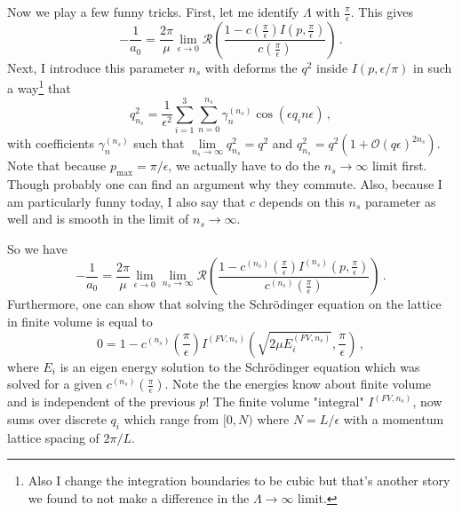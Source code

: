\documentclass[aps,superscriptaddress,tightenlines,nofootinbib,floatfix,longbibliography,notitlepage]{revtex4-1}
\begin{document}
Now we play a few funny tricks.
First, let me identify $\Lambda$ with $\frac{\pi}{\epsilon}$.
This gives
\begin{equation}
	- \frac{1}{a_0}
	=
	\frac{2 \pi}{\mu}
	\lim\limits_{\epsilon \to 0} \mathcal R \left(\frac{1 - c\left(\frac{\pi}{\epsilon}\right) I\left(p, \frac{\pi}{\epsilon}\right)}{c\left(\frac{\pi}{\epsilon}\right)} \right)
	\, .
\end{equation}
Next, I introduce this parameter $n_s$ with deforms the $q^2$ inside $I(p, \epsilon/\pi)$ in such a way\footnote{Also I change the integration boundaries to be cubic but that's another story we found to not make a difference in the $\Lambda \to \infty$ limit.} that
\begin{equation}
	q^2_{n_s} = \frac{1}{\epsilon^2}\sum_{i=1}^3\sum_{n=0}^{n_s}  \gamma_n^{(n_s)} \cos(\epsilon q_i n \epsilon) \, ,
\end{equation}
with coefficients $\gamma_n^{(n_s)}$ such that $\lim\limits_{n_s \to \infty} q^2_{n_s} = q^2$ and $q^2_{n_s} = q^2(1 + \mathcal O(q\epsilon)^{2 n_s})$.
Note that because $p_\text{max} = \pi / \epsilon$, we actually have to do the $n_s \to \infty$ limit first.
Though probably one can find an argument why they commute.
Also, because I am particularly funny today, I also say that $c$ depends on this $n_s$ parameter as well and is smooth in the limit of $n_s \to \infty$.

So we have
\begin{equation}
	- \frac{1}{a_0}
	=
	\frac{2 \pi}{\mu}
	\lim\limits_{\epsilon \to 0} \lim\limits_{n_s \to \infty}\mathcal R \left(\frac{1 - c^{(n_s)}\left(\frac{\pi}{\epsilon}\right) I^{(n_s)}\left(p, \frac{\pi}{\epsilon}\right)}{c^{(n_s)}\left(\frac{\pi}{\epsilon}\right)} \right)
	\, .
\end{equation}
Furthermore, one can show that solving the Schrödinger equation on the lattice in finite volume is equal to
\begin{equation}
	0 = 1 - c^{(n_s)}\left(\frac{\pi}{\epsilon}\right) I^{(FV, n_s)}\left(\sqrt{2\mu E_i^{(FV, n_s)}}, \frac{\pi}{\epsilon}\right)
	\, ,
\end{equation}
where $E_i$ is an eigen energy solution to the Schrödinger equation which was solved for a given $c^{(n_s)}\left(\frac{\pi}{\epsilon}\right)$.
Note the the energies know about finite volume and is independent of the previous $p$!
The finite volume "integral" $I^{(FV, n_s)}$, now sums over discrete $q_i$ which range from $[0, N)$ where $N = L / \epsilon$ with a momentum lattice spacing of $2\pi/L$.
\end{document}
